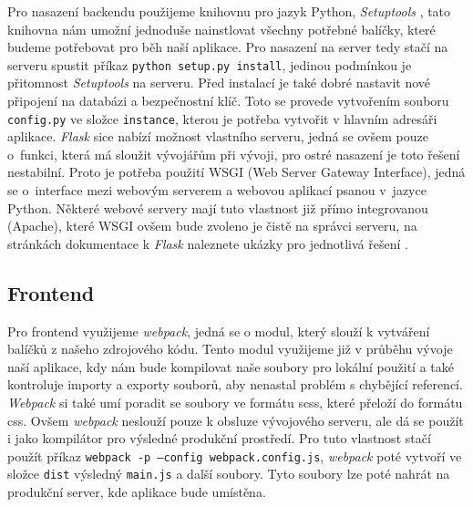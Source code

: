 Pro nasazení backendu použijeme knihovnu pro jazyk Python, \textit{Setuptools} \cite{setupTools}, tato knihovna nám umožní
jednoduše nainstlovat všechny potřebné balíčky, které budeme potřebovat pro běh naší aplikace. Pro nasazení na server
tedy stačí na serveru spustit příkaz \texttt{python setup.py install}, jedinou podmínkou je přitomnost \textit{Setuptools}
na serveru. Před instalací je také dobré nastavit nové připojení na databázi a bezpečnostní klíč. Toto se provede vytvořením
souboru \texttt{config.py} ve složce \texttt{instance}, kterou je potřeba vytvořit v hlavním adresáři aplikace. \textit{Flask} sice nabízí možnost vlastního serveru, jedná se ovšem
pouze o~funkci, která má sloužit vývojářům při vývoji, pro ostré nasazení je toto řešení nestabilní. Proto je potřeba použití WSGI (Web Server Gateway Interface), jedná se o~interface
mezi webovým serverem a webovou aplikací psanou v~jazyce Python. Některé webové servery mají tuto vlastnost již přímo integrovanou (Apache), které WSGI ovšem bude zvoleno
je čistě na správci serveru, na stránkách dokumentace k \textit{Flask} naleznete ukázky pro jednotlivá řešení \cite{flaskDeploy}.


\subsection{Frontend}

Pro frontend využijeme \textit{webpack}, jedná se o modul, který slouží k vytváření balíčků z našeho zdrojového kódu. Tento modul
využijeme již v průběhu vývoje naší aplikace, kdy nám bude kompilovat naše soubory pro lokální použití a také kontroluje importy a exporty
souborů, aby nenastal problém s chybějící referencí. \textit{Webpack} si také umí poradit se soubory ve formátu \gls{scss}, které přeloží
do formátu \gls{css}. Ovšem \textit{webpack} neslouží pouze k obsluze vývojového serveru, ale dá se použít i jako kompilátor pro výsledné
produkční prostředí. Pro tuto vlastnost stačí použít příkaz \texttt{webpack -p --config webpack.config.js}, \textit{webpack} poté vytvoří
ve složce \texttt{dist} výsledný \texttt{main.js} a další soubory. Tyto soubory lze poté nahrát na produkční server, kde aplikace bude
umístěna.
